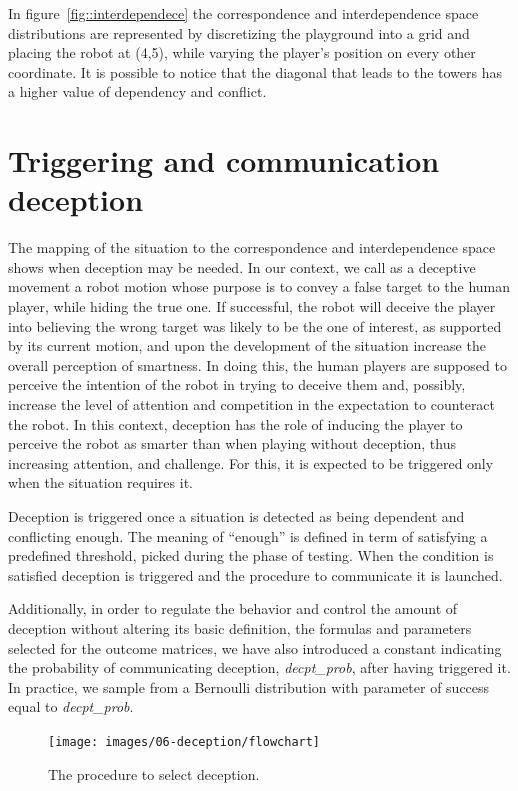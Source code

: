 In figure~\ref{fig::interdependece} the correspondence and interdependence space distributions are represented by discretizing the playground into a grid and placing the robot at (4,5), while varying the  player's position on every other coordinate. It is possible to notice that the diagonal that leads to the towers has a higher value of dependency and conflict.

\section{Triggering and communication deception}
The mapping of the situation to the correspondence and interdependence space shows when deception may be needed. In our context, we call as a deceptive movement a robot motion whose purpose is to convey a false target to the human player, while hiding the true one. If successful, the robot will deceive the player into believing the wrong target was likely to be the one of interest, as supported by its current motion, and upon the development of the situation increase the overall perception of smartness. In doing this, the human players are supposed to perceive the intention of the robot in trying to deceive them and, possibly, increase the level of attention and competition in the expectation to counteract the robot. In this context, deception has the role of inducing the player to perceive the robot as smarter than when playing without deception, thus increasing attention, and challenge. For this, it is expected to be triggered only when the situation requires it. 

Deception is triggered once a situation is detected as being dependent and conflicting enough. The meaning of ``enough'' is defined in term of satisfying a predefined threshold, picked during the phase of testing. When the condition is satisfied deception is triggered and the procedure to communicate it is launched.

Additionally, in order to regulate the behavior and control the amount of deception without altering its basic definition, \ie the formulas and parameters selected for the outcome matrices, we have also introduced a constant indicating the probability of communicating deception, \textit{decpt\_prob},  after having triggered it. In practice, we sample from a Bernoulli distribution with parameter of success equal to \textit{decpt\_prob}. 

\begin{figure}[h]
    \centering
    \texttt{[image: images/06-deception/flowchart]}
    \caption{The procedure to select deception.}
    \label{fig:flowchart}
\end{figure}


